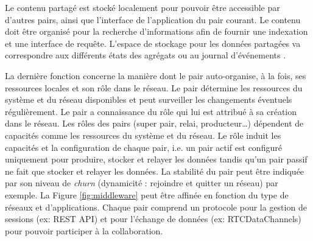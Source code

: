 Le contenu partagé est stocké localement pour pouvoir être accessible par d'autres 
pairs, ainsi que l'interface de l'application du pair courant. Le contenu doit être 
organisé pour la recherche d'informations afin de fournir une indexation et une 
interface de requête. 
L'espace de stockage pour les données partagées va correspondre aux différents 
états des agrégats \cite{Desprat2015a,Desprat2015b} ou au journal d'événements 
\cite{Desprat2016,Desprat2017}.


La dernière fonction concerne la manière dont le pair auto-organise, à la fois, ses 
ressources locales et son rôle dans le réseau. Le pair détermine les 
ressources du système et du réseau disponibles et peut surveiller les 
changements éventuels régulièrement.
Le pair a connaissance du rôle qui lui est attribué à sa création dans le réseau. Les 
rôles des pairs (super pair, relai, producteur\dots) dépendent de 
capacités comme les ressources du système et du réseau. Le rôle induit les 
capacités et la configuration de chaque pair, i.e. un pair actif est configuré 
uniquement pour produire, stocker et relayer les données tandis qu'un pair passif ne fait que stocker et relayer les données. La stabilité du pair peut être indiquée par son niveau de 
\textit{churn} (dynamicité : rejoindre et quitter un réseau) par exemple. 
La Figure \ref{fig:middleware} peut être affinée en fonction du type de 
réseaux et d'applications. Chaque pair comprend un protocole pour la gestion
de sessions (ex: REST API) et pour l'échange de données (ex: RTCDataChannels)  
pour pouvoir participer à la collaboration.



